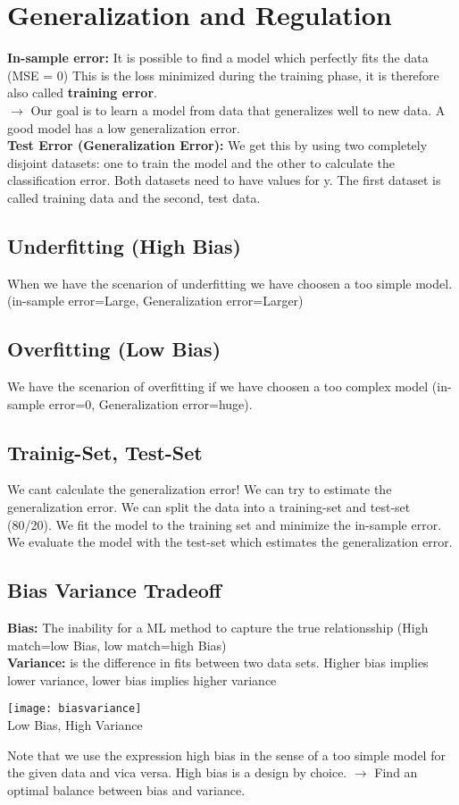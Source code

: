 \section{Generalization and Regulation}
\textbf{In-sample error:} It is possible to find a model which perfectly fits the data (MSE = 0) This is the loss minimized
during the training phase, it is therefore also called \textbf{training error}.\\
$\rightarrow$ Our goal is to learn a model from data that generalizes well to new data. A good model has a low generalization error.\\
\textbf{Test Error (Generalization Error):} We get this by using two completely disjoint datasets: one to train the model and the other to calculate the classification error. Both datasets need to have values for y. The first dataset is called training data and the second, test data.

\subsection{Underfitting (High Bias)}
When we have the scenarion of underfitting we have choosen a too simple model. (in-sample error=Large, Generalization error=Larger)

\subsection{Overfitting (Low Bias)}
We have the scenarion of overfitting if we have choosen a too complex model (in-sample error=0, Generalization error=huge).

\subsection{Trainig-Set, Test-Set}
We cant calculate the generalization error! We can try to estimate the generalization error. We can split the data into a training-set and test-set (80/20). We fit the model to the training set and minimize the in-sample error. We evaluate the model with the test-set which estimates the generalization error.

\subsection{Bias Variance Tradeoff}
\begin{minipage}{0,5\linewidth}
	\textbf{Bias:} The inability for a ML method to capture the true relationsship (High match=low Bias, low match=high Bias)\\
	\textbf{Variance:} is the difference in fits between two data sets.
	Higher bias implies lower variance, lower bias implies higher variance
\end{minipage}
\begin{minipage}{0,5\linewidth}
	\texttt{[image: biasvariance]}\\
	Low Bias, High Variance
\end{minipage}
Note that we use the expression high bias in the sense of a too simple model for the given data and vica versa. High bias is a design by choice. $\rightarrow$ Find an optimal balance between bias and variance.

